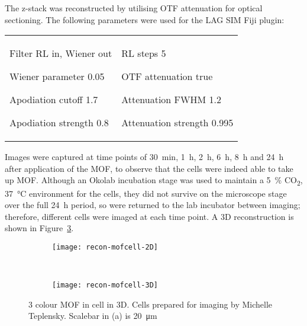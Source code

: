 The z-stack was reconstructed by utilising OTF attenuation for optical sectioning. 
The following parameters were used for the LAG SIM Fiji plugin:\newline
\begin{tabular}{p{}p{}}
\begin{labelling}[margin={Attenuation strength}]
	\item[Filter] RL in, Wiener out
	\item[Wiener parameter] 0.05
	\item[Apodiation cutoff] 1.7
	\item[Apodiation strength] 0.8
\end{labelling} &
\begin{labelling}[margin={Attenuation strength}]
	\item[RL steps] 5
	\item[OTF attenuation] true
	\item[Attenuation FWHM] 1.2
	\item[Attenuation strength] 0.995 
\end{labelling} %
\end{tabular}

Images were captured at time points of \SI{30}{\minute}, \SI{1}{\hour}, \SI{2}{\hour}, \SI{6}{\hour}, \SI{8}{\hour} and \SI{24}{\hour} after application of the MOF, to observe that the cells were indeed able to take up MOF.
Although an Okolab incubation stage was used to maintain a \SI{5}{\percent} CO\textsubscript{2}, \SI{37}{\degreeCelsius} environment for the cells, they did not survive on the microscope stage over the full \SI{24}{\hour} period, so were returned to the lab incubator between imaging; therefore, different cells were imaged at each time point. 
A 3D reconstruction is shown in Figure~\ref{fig:recon-mofcell}. 

\begin{figure}[tbp!]
\centering
\begin{subfigure}[b]{0.7\textwidth}
	\texttt{[image: recon-mofcell-2D]}
	\caption{}\label{fig:recon-mofcell-2D}
\end{subfigure}

~\newline
\begin{subfigure}[b]{0.7\textwidth}
	\texttt{[image: recon-mofcell-3D]}
	\caption{}\label{fig:recon-mofcell-3D}
\end{subfigure}
\caption[LAG SIM: 3D reconstruction of HeLa cells]{3 colour MOF in cell in 3D. Cells prepared for imaging by Michelle Teplensky. Scalebar in (a) is \SI{20}{\micro\metre}}
\label{fig:recon-mofcell}
\end{figure}

